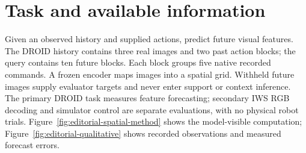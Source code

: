 \section{Task and available information}
\label{sec:editorial-task}
Given an observed history and supplied actions, predict future visual features.
The DROID history contains three real images and two past action blocks; the
query contains ten future blocks. Each block groups five native recorded
commands. A frozen encoder maps images into a spatial grid. Withheld future
images supply evaluator targets and never enter support or context inference.
The primary DROID task measures feature forecasting; secondary IWS RGB decoding
and simulator control are separate evaluations, with no physical robot trials.
Figure~\ref{fig:editorial-spatial-method} shows the
model-visible computation; Figure~\ref{fig:editorial-qualitative} shows recorded
observations and measured forecast errors.
